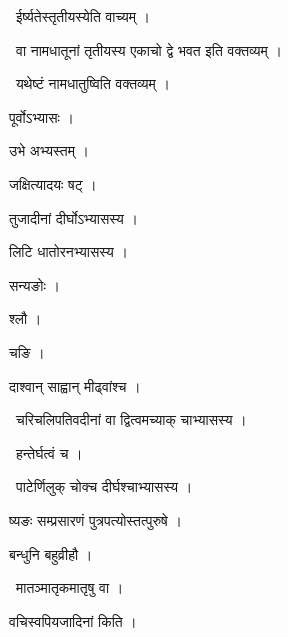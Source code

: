 \documentclass[10pt, openany, oneside]{book}
\begin{document}
\par\noindent\hspace{1.5em}{\vps वा॰}~{\qt ईर्ष्यतेस्तृतीयस्येति वाच्यम् ।}

\par\noindent\hspace{1.5em}{\vps वा॰}~{\qt वा नामधातूनां तृतीयस्य एकाचो द्वे भवत इति वक्तव्यम् ।}

\par\noindent\hspace{1.5em}{\vps वा॰}~{\qt यथेष्टं नामधातुष्विति वक्तव्यम् ।}

\noindent पूर्वोऽभ्यासः ।

\noindent उभे अभ्यस्तम् ।

\noindent जक्षित्यादयः षट् ।

\noindent तुजादीनां दीर्घोऽभ्यासस्य ।

\noindent लिटि धातोरनभ्यासस्य ।

\noindent सन्यङोः ।

\noindent श्लौ ।

\noindent चङि ।

\noindent दाश्वान् साह्वान् मीढ्वांश्च ।

\par\noindent\hspace{1.5em}{\vps वा॰}~{\qt चरिचलिपतिवदीनां वा द्वित्वमच्याक् चाभ्यासस्य ।}

\par\noindent\hspace{1.5em}{\vps वा॰}~{\qt हन्तेर्घत्वं च ।}

\par\noindent\hspace{1.5em}{\vps वा॰}~{\qt पाटेर्णिलुक् चोक्च दीर्घश्चाभ्यासस्य ।}

\noindent ष्यङः सम्प्रसारणं पुत्रपत्योस्तत्पुरुषे ।

\noindent बन्धुनि बहुव्रीहौ ।

\par\noindent\hspace{1.5em}{\vps वा॰}~{\qt मातञ्मातृकमातृषु वा ।}

\noindent वचिस्वपियजादिनां किति ।
\end{document}
